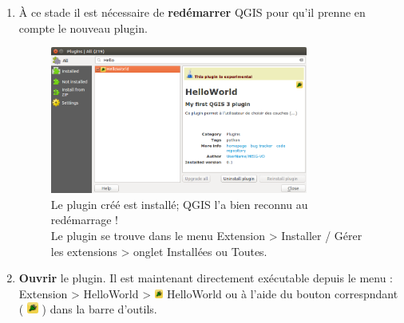 \documentclass[11pt]{article}
\begin{document}
\begin{enumerate}

\vspace*{1em}
\item À ce stade il est nécessaire de \textbf{redémarrer} QGIS pour qu'il prenne en compte le nouveau plugin.

\begin{figure}[H]
  	\centering		
	\includegraphics[width=0.8\textwidth]{hello2018_plugin.png}
	\caption[Le plugin créé est installé; QGIS l'a bien reconnu au redémarrage !]{Le plugin créé est installé; QGIS l'a bien reconnu au redémarrage !\\
	Le plugin se trouve dans le menu \og{}Extension > Installer / Gérer les extensions\fg{} > onglet \og{}Installées\fg{} ou \og{}Toutes\fg{}.}
	\label{hello2018}
\end{figure}


\item \textbf{Ouvrir} le plugin. Il est maintenant directement exécutable depuis le menu :\\
\og{}Extension > HelloWorld > \includegraphics[width=0.76em]{hello2018_icon.png} HelloWorld\fg{} ou à l'aide du bouton correspndant ( \includegraphics[width=1em]{hello2018_icon.png} ) dans la barre d'outils.



\end{enumerate}
\end{document}
